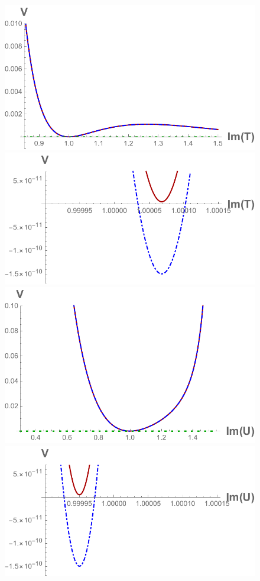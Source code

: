 \documentclass[12pt]{report}
\begin{document}
\begin{figure}[htb]
\includegraphics[scale=0.55]{fibreTLarge.pdf} \qquad\includegraphics[scale=0.6]{fibreTClose.pdf}\\
\includegraphics[scale=0.55]{fibreULarge.pdf} \qquad\includegraphics[scale=0.6]{fibreUClose.pdf}

\end{figure}
\end{document}
